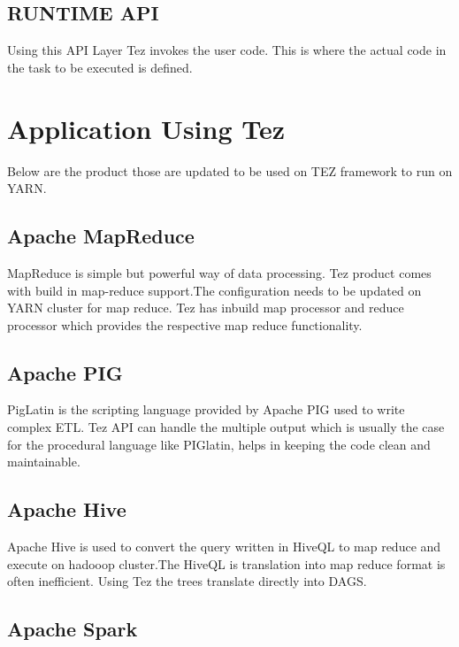 \documentclass[9pt,twocolumn,twoside]{../../styles/osajnl}
\begin{document}
\subsection{RUNTIME API}
 	
	Using this API Layer Tez invokes the user code. This is where the actual code in the task  
to be executed is defined.


\section{Application Using Tez}

     Below are the product those are updated to be used on TEZ framework to run on YARN.
 
               
\subsection{Apache MapReduce}
      
    MapReduce is simple but powerful way of data processing. Tez product comes with
    build in map-reduce support.The configuration needs to be updated on YARN cluster
    for map reduce. Tez has inbuild map processor and reduce processor which provides the
    respective map reduce functionality.
               
 \subsection{Apache PIG}              
              
   PigLatin is the scripting language provided by Apache PIG used to write complex ETL.
   Tez API can handle the multiple output which is usually the case for the procedural language    like PIGlatin, helps in keeping the code clean and maintainable.
 
  \subsection{Apache Hive}
              
   Apache Hive is used to convert the query written in HiveQL to map reduce and execute on hadooop cluster.The HiveQL is translation into map reduce format is often inefficient. Using Tez the trees translate directly into DAGS.
               
 \subsection{Apache Spark}
         
\end{document}
